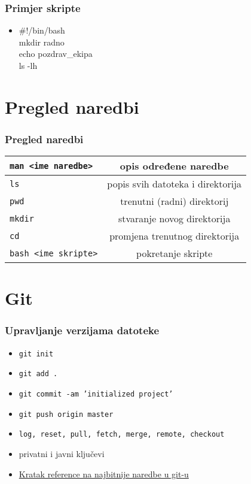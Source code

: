 \documentclass{beamer}
\newcommand{\shell}[1]{\texttt{#1}}
\begin{document}
\begin{frame}[t]
\frametitle{Primjer skripte}
\begin{itemize}
  \item \#!/bin/bash \\ mkdir radno \\ echo pozdrav\_ekipa \\ ls -lh
\end{itemize}
\end{frame}

\section{Pregled naredbi}
\begin{frame}[t]
\frametitle{Pregled naredbi}
\begin{tabular}{| l | c |} \hline
  \shell{man <ime naredbe>} & opis određene naredbe \\ \hline
  \shell{ls} & popis svih datoteka i direktorija \\ \hline
  \shell{pwd} & trenutni (radni) direktorij \\ \hline
  \shell {mkdir} & stvaranje novog direktorija \\ \hline
  \shell{cd} & promjena trenutnog direktorija \\ \hline
  \shell{bash <ime skripte>} & pokretanje skripte \\ \hline

\end{tabular}
\end{frame}

\section{Git}
\begin{frame}[t]
\frametitle{Upravljanje verzijama datoteke}
\begin{itemize}
  \item \texttt{git init}
  \item \texttt{git add .}
  \item \texttt{git commit -am 'initialized project'}
  \item \texttt{git push origin master}

  \item \texttt{log, reset, pull, fetch, merge, remote, checkout}
  \item privatni i javni ključevi
  \item \href{http://rogerdudler.github.io/git-guide/}{Kratak reference na najbitnije naredbe u git-u}
\end{itemize}
\end{frame}
\end{document}
